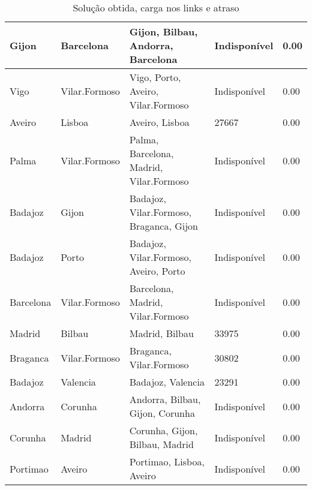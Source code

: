 \begin{table}[!htb]
{\begin{tabular}{|l|l|l|l|l|}
Gijon & Barcelona & Gijon, Bilbau, Andorra, Barcelona & Indisponível & 0.00 \\ \hline
Vigo & Vilar.Formoso & Vigo, Porto, Aveiro, Vilar.Formoso & Indisponível & 0.00 \\ \hline
Aveiro & Lisboa & Aveiro, Lisboa & 27667 & 0.00 \\ \hline
Palma & Vilar.Formoso & Palma, Barcelona, Madrid, Vilar.Formoso & Indisponível & 0.00 \\ \hline
Badajoz & Gijon & Badajoz, Vilar.Formoso, Braganca, Gijon & Indisponível & 0.00 \\ \hline
Badajoz & Porto & Badajoz, Vilar.Formoso, Aveiro, Porto & Indisponível & 0.00 \\ \hline
Barcelona & Vilar.Formoso & Barcelona, Madrid, Vilar.Formoso & Indisponível & 0.00 \\ \hline
Madrid & Bilbau & Madrid, Bilbau & 33975 & 0.00 \\ \hline
Braganca & Vilar.Formoso & Braganca, Vilar.Formoso & 30802 & 0.00 \\ \hline
Badajoz & Valencia & Badajoz, Valencia & 23291 & 0.00 \\ \hline
Andorra & Corunha & Andorra, Bilbau, Gijon, Corunha & Indisponível & 0.00 \\ \hline
Corunha & Madrid & Corunha, Gijon, Bilbau, Madrid & Indisponível & 0.00 \\ \hline
Portimao & Aveiro & Portimao, Lisboa, Aveiro & Indisponível & 0.00 \\ \hline
\end{tabular}}
\caption[]{Solução obtida, carga nos links e atraso}
\end{table}


